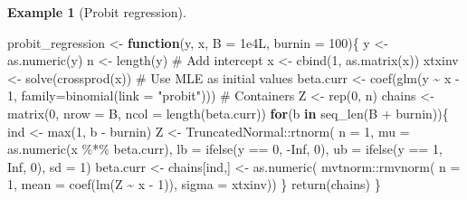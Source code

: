 \documentclass[
  11pt,
  letterpaper,
]{scrbook}
\newenvironment{Shaded}{\begin{snugshade}}{\end{snugshade}}
\newcommand{\AttributeTok}[1]{\textcolor[rgb]{0.40,0.45,0.13}{#1}}
\newcommand{\CommentTok}[1]{\textcolor[rgb]{0.37,0.37,0.37}{#1}}
\newcommand{\ConstantTok}[1]{\textcolor[rgb]{0.56,0.35,0.01}{#1}}
\newcommand{\ControlFlowTok}[1]{\textcolor[rgb]{0.00,0.23,0.31}{\textbf{#1}}}
\newcommand{\DecValTok}[1]{\textcolor[rgb]{0.68,0.00,0.00}{#1}}
\newcommand{\FloatTok}[1]{\textcolor[rgb]{0.68,0.00,0.00}{#1}}
\newcommand{\FunctionTok}[1]{\textcolor[rgb]{0.28,0.35,0.67}{#1}}
\newcommand{\NormalTok}[1]{\textcolor[rgb]{0.00,0.23,0.31}{#1}}
\newcommand{\OtherTok}[1]{\textcolor[rgb]{0.00,0.23,0.31}{#1}}
\newcommand{\SpecialCharTok}[1]{\textcolor[rgb]{0.37,0.37,0.37}{#1}}
\newcommand{\StringTok}[1]{\textcolor[rgb]{0.13,0.47,0.30}{#1}}
\theoremstyle{definition}
\newtheorem{example}{Example}[chapter]
\theoremstyle{plain}
\theoremstyle{plain}
\theoremstyle{plain}
\theoremstyle{definition}
\theoremstyle{definition}
\theoremstyle{plain}
\theoremstyle{plain}
\theoremstyle{remark}
\begin{document}
\begin{example}[Probit
regression]
\begin{Shaded}
\begin{Highlighting}[]
\NormalTok{probit\_regression }\OtherTok{\textless{}{-}} \ControlFlowTok{function}\NormalTok{(y, x, }\AttributeTok{B =} \FloatTok{1e4}\NormalTok{L, }\AttributeTok{burnin =} \DecValTok{100}\NormalTok{)\{}
\NormalTok{  y }\OtherTok{\textless{}{-}} \FunctionTok{as.numeric}\NormalTok{(y)}
\NormalTok{  n }\OtherTok{\textless{}{-}} \FunctionTok{length}\NormalTok{(y)}
  \CommentTok{\# Add intercept}
\NormalTok{  x }\OtherTok{\textless{}{-}} \FunctionTok{cbind}\NormalTok{(}\DecValTok{1}\NormalTok{, }\FunctionTok{as.matrix}\NormalTok{(x))}
\NormalTok{  xtxinv }\OtherTok{\textless{}{-}} \FunctionTok{solve}\NormalTok{(}\FunctionTok{crossprod}\NormalTok{(x))}
  \CommentTok{\# Use MLE as initial values}
\NormalTok{  beta.curr }\OtherTok{\textless{}{-}} \FunctionTok{coef}\NormalTok{(}\FunctionTok{glm}\NormalTok{(y }\SpecialCharTok{\textasciitilde{}}\NormalTok{ x }\SpecialCharTok{{-}} \DecValTok{1}\NormalTok{, }\AttributeTok{family=}\FunctionTok{binomial}\NormalTok{(}\AttributeTok{link =} \StringTok{"probit"}\NormalTok{)))}
  \CommentTok{\# Containers}
\NormalTok{  Z }\OtherTok{\textless{}{-}} \FunctionTok{rep}\NormalTok{(}\DecValTok{0}\NormalTok{, n)}
\NormalTok{  chains }\OtherTok{\textless{}{-}} \FunctionTok{matrix}\NormalTok{(}\DecValTok{0}\NormalTok{, }\AttributeTok{nrow =}\NormalTok{ B, }\AttributeTok{ncol =} \FunctionTok{length}\NormalTok{(beta.curr))}
  \ControlFlowTok{for}\NormalTok{(b }\ControlFlowTok{in} \FunctionTok{seq\_len}\NormalTok{(B }\SpecialCharTok{+}\NormalTok{ burnin))\{}
\NormalTok{    ind }\OtherTok{\textless{}{-}} \FunctionTok{max}\NormalTok{(}\DecValTok{1}\NormalTok{, b }\SpecialCharTok{{-}}\NormalTok{ burnin)}
\NormalTok{    Z }\OtherTok{\textless{}{-}}\NormalTok{ TruncatedNormal}\SpecialCharTok{::}\FunctionTok{rtnorm}\NormalTok{(}
      \AttributeTok{n =} \DecValTok{1}\NormalTok{,}
      \AttributeTok{mu =} \FunctionTok{as.numeric}\NormalTok{(x }\SpecialCharTok{\%*\%}\NormalTok{ beta.curr),}
      \AttributeTok{lb =} \FunctionTok{ifelse}\NormalTok{(y }\SpecialCharTok{==} \DecValTok{0}\NormalTok{, }\SpecialCharTok{{-}}\ConstantTok{Inf}\NormalTok{, }\DecValTok{0}\NormalTok{),}
      \AttributeTok{ub =} \FunctionTok{ifelse}\NormalTok{(y }\SpecialCharTok{==} \DecValTok{1}\NormalTok{, }\ConstantTok{Inf}\NormalTok{, }\DecValTok{0}\NormalTok{),}
      \AttributeTok{sd =} \DecValTok{1}\NormalTok{)}
\NormalTok{    beta.curr }\OtherTok{\textless{}{-}}\NormalTok{ chains[ind,] }\OtherTok{\textless{}{-}} \FunctionTok{as.numeric}\NormalTok{(}
\NormalTok{      mvtnorm}\SpecialCharTok{::}\FunctionTok{rmvnorm}\NormalTok{(}
        \AttributeTok{n =} \DecValTok{1}\NormalTok{,}
        \AttributeTok{mean =} \FunctionTok{coef}\NormalTok{(}\FunctionTok{lm}\NormalTok{(Z }\SpecialCharTok{\textasciitilde{}}\NormalTok{ x }\SpecialCharTok{{-}} \DecValTok{1}\NormalTok{)),}
        \AttributeTok{sigma =}\NormalTok{ xtxinv))}
\NormalTok{  \}}
\FunctionTok{return}\NormalTok{(chains)}
\NormalTok{\}}
\end{Highlighting}
\end{Shaded}

\end{example}
\end{document}

